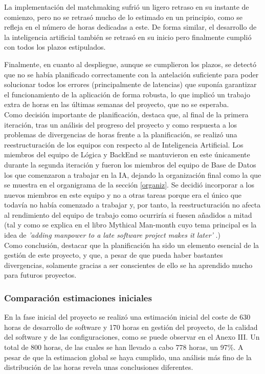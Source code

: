 La implementación del matchmaking sufrió un ligero retraso en su instante de comienzo, pero no se retrasó mucho de lo estimado en un principio, como se refleja en el número de horas dedicadas a este. De forma similar, el desarrollo de la inteligencia artificial también se retrasó en su inicio pero finalmente cumplió con todos los plazos estipulados.

Finalmente, en cuanto al despliegue, aunque se cumplieron los plazos, se detectó que no se había planificado correctamente con la antelación suficiente para poder solucionar todos los errores (principalmente de latencias) que suponía garantizar el funcionamiento de la aplicación de forma robusta, lo que implicó un trabajo extra de horas en las últimas semanas del proyecto, que no se esperaba.\\

Como decisión importante de planificación, destaca que, al final de la primera iteración, tras un análisis del progreso del proyecto y como respuesta a los problemas de divergencias de horas frente a la planificación, se realizó una reestructuración de los equipos con respecto al de Inteligencia Artificial. Los miembros del equipo de Lógica y BackEnd se mantuvieron en este únicamente durante la segunda iteración y fueron los miembros del equipo de Base de Datos los que comenzaron a trabajar en la IA, dejando la organización final como la que se muestra en el organigrama de la sección \ref{organiz}. Se decidió incorporar a los nuevos miembros en este equipo y no a otras tareas porque era el único que todavía no había comenzado a trabajar y, por tanto, la reestructuración no afecta al rendimiento del equipo de trabajo como ocurriría si fuesen añadidos a mitad (tal y como se explica en el libro Mythical Man-month cuyo tema principal es la idea de \textit{'adding manpower to a late software project makes it later'} \cite{libroMMM}.)\\

Como conclusión, destacar que la planificación ha sido un elemento esencial de la gestión de este proyecto, y que, a pesar de que pueda haber bastantes divergencias, solamente gracias a ser conscientes de ello se ha aprendido mucho para futuros proyectos.

\subsubsection{Comparación estimaciones iniciales}
En la fase inicial del proyecto se realizó una estimación inicial del coste de 630 horas de desarrollo de software y 170 horas en gestión del proyecto, de la calidad del software y de las configuraciones, como se puede observar en el Anexo III. Un total de 800 horas, de las cuales se han llevado a cabo 778 horas, un 97\%. A pesar de que la estimacion global se haya cumplido, una análisis más fino de la distribución de las horas revela unas conclusiones diferentes.

